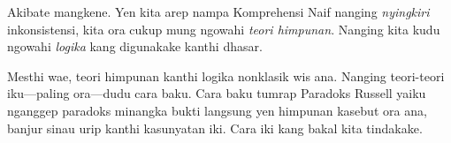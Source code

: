 \documentclass[../../../include/open-logic-section]{subfiles}
\begin{document}
Akibate mangkene. Yen kita arep nampa Komprehensi Naif
nanging \emph{nyingkiri} inkonsistensi, kita ora cukup mung
ngowahi \emph{teori himpunan}. Nanging kita kudu ngowahi
\emph{logika} kang digunakake kanthi dhasar.

Mesthi wae, teori himpunan kanthi logika nonklasik wis ana.
Nanging teori-teori iku---paling ora---dudu cara baku.
Cara baku tumrap Paradoks Russell yaiku nganggep
paradoks minangka bukti langsung yen himpunan kasebut ora
ana, banjur sinau urip kanthi kasunyatan iki. Cara
iki kang bakal kita tindakake.
\end{document}
